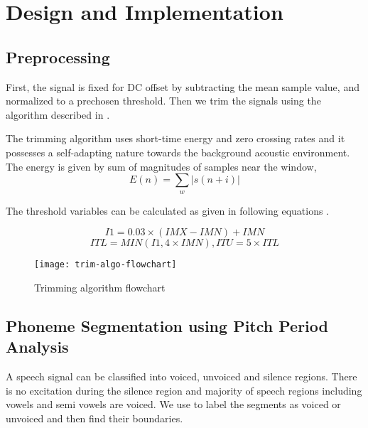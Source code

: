 \chapter{Design and Implementation} \label{ch:proposal}

\section{Preprocessing}

First, the signal is fixed for DC offset by subtracting the mean sample value, and normalized to a prechosen threshold. Then we trim the signals using the algorithm described in \cite{6778857}.

The trimming algorithm uses short-time energy and zero crossing rates and it possesses a self-adapting nature towards the background acoustic environment. The energy is given by sum of magnitudes of samples near the window,
\begin{equation} E(n) = \sum_w|s(n+i)| \end{equation}

The threshold variables can be calculated as given in following equations \cite{6778857}.

\begin{equation} I1 = 0.03 \times (IMX - IMN) + IMN \end{equation}
\begin{equation} ITL = MIN(I1 , 4 \times IMN), ITU = 5 \times ITL \end{equation}
    
\begin{figure}[h!]
    \centering
    \texttt{[image: trim-algo-flowchart]}
    \label{fig:trim-algo-flowchart}
    \caption{Trimming algorithm flowchart \cite{6778857}}
\end{figure}

\section{Phoneme Segmentation using Pitch Period Analysis}

A speech signal can be classified into voiced, unvoiced and silence regions. There is no excitation during the silence region and majority of speech regions including vowels and semi vowels are voiced. We use \cite{1162765} to label the segments as voiced or unvoiced and then find their boundaries.

